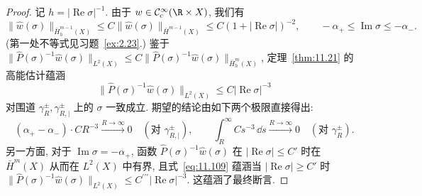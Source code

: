 \begin{proof}
记 $h = |\operatorname{Re}\sigma|^{-1}$. 由于 $w \in \mathcal{C}_{\mathrm{c}}^\infty(\R \times X)$, 我们有
\begin{equation}\label{eq:11.108}
    \|\hat w(\sigma)\|_{\bar H_h^{m-1}(X)} \le C \|\hat w(\sigma)\|_{\bar H^{m-1}(X)} \le C (1 + |\operatorname{Re}\sigma|)^{-2}, \qquad -\alpha_+ \le \operatorname{Im}\sigma \le -\alpha_-.
\end{equation}
(第一处不等式见习题~\ref{ex:2.23}.) 鉴于 $\|\widehat{P}(\sigma)^{-1} \hat w(\sigma)\|_{L^2(X)} \le C \|\widehat{P}(\sigma)^{-1} \hat w(\sigma)\|_{\bar H_h^m(X)}$, 定理~\ref{thm:11.21} 的高能估计蕴涵
\begin{equation}\label{eq:11.109}
    \|\widehat{P}(\sigma)^{-1} \hat w(\sigma)\|_{L^2(X)} \le C |\operatorname{Re}\sigma|^{-3}
\end{equation}
对围道 $\gamma_R^\pm, \gamma_{R, |}^\pm$ 上的 $\sigma$ 一致成立. 期望的结论由如下两个极限直接得出:
\[
    (\alpha_+ - \alpha_-) \cdot C R^{-3} \xrightarrow{R \to \infty} 0 \quad (\text{对 } \gamma_{R, |}^\pm), \qquad \int_R^\infty C s^{-3} \,\dd s \xrightarrow{R \to \infty} 0 \quad (\text{对 } \gamma_R^\pm).
\]
另一方面, 对于 $\operatorname{Im}\sigma = -\alpha_+$, 函数 $\widehat{P}(\sigma)^{-1} \hat w(\sigma)$ 在 $|\operatorname{Re}\sigma| \le C'$ 时在 $\bar H^m(X)$ 从而在 $L^2(X)$ 中有界, 且式~\eqref{eq:11.109} 蕴涵当 $|\operatorname{Re}\sigma| \ge C'$ 时 $\|\widehat{P}(\sigma)^{-1} \hat w(\sigma)\|_{L^2(X)} \le C^{\prime\prime\prime} |\operatorname{Re}\sigma|^{-3}$. 这蕴涵了最终断言.
\end{proof}

